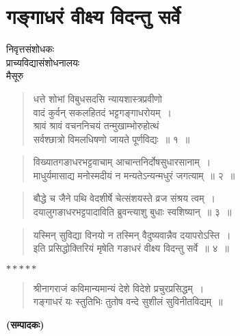 {\fontsize{15}{17}\selectfont
\presetvalues
\chapter{गङ्गाधरं वीक्ष्य विदन्तु सर्वे}

\begin{center}
\smallskip

निवृत्तसंशोधकः\\ 
प्राच्यविद्यासंशोधनालयः\\  
मैसूरु
\addrule
\end{center}

\begin{verse}
धत्ते शोभां विबुधसदसि न्यायशास्त्रप्रवीणो\\
वादं कुर्वन् सकलहितदं भट्टगङ्गाधरोयम्~।\\
श्रावं श्रावं वचननिचयं तन्मुखाम्भोरुहोत्थं\\
सर्वश्छात्रो विमलधिषणो जायते पूर्णविद्यः~॥ १~॥
\end{verse}

\begin{verse}
विख्यातगङाधरभट्टवाचाम् आचान्तनिर्दोषसुधारसानाम्~।\\
माधुर्यमासाद्य मनोस्मदीयं न मन्यतेऽन्यन्मधुरं जगत्याम्~॥ २~॥
\end{verse}

\begin{verse}
बौद्धे च जैने पथि वेदशीर्षे चेत्संशयस्ते व्रज संश्रय त्वम्~।\\
दयालुगङाधरभट्टपादाविति ब्रुवन्त्याशु बुधाः स्वशिष्यान्~॥ ३~॥
\end{verse}

\begin{verse}
यस्मिन् सुविद्या विनयो न तस्मिन् वैदुष्यवान्नैव दयापरोऽस्ति~।\\
इति प्रसिद्धोक्तिरियं मृषेति गङाधरं वीक्ष्य विदन्तु सर्वे~॥ ४~॥
\end{verse}

\centerline{$*****$}

\begin{verse}
श्रीनागराजं कविमान्यमान्यं देशे विदेशे प्रचुरप्रसिद्धम्~।\\
गङ्गाधरं यः स्तुतिभिः तुतोष वन्दे सुशीलं सुविनीतविद्यम्~॥
\end{verse}

\hspace{6cm}\textbf{(सम्पादकः)}

\articleend
}
